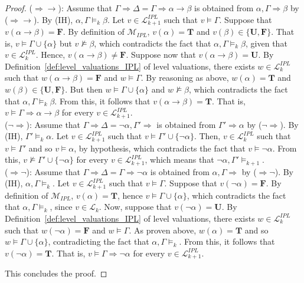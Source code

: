 \documentclass[12pt]{article}
\newcommand{\bT}{\mathbf{T}}
\newcommand{\bU}{\mathbf{U}}
\newcommand{\bF}{\mathbf{F}}
\begin{document}
\begin{proof}
%
($\Rightarrow\to$): Assume that $\Gamma \Rightarrow\Delta= \Gamma\Rightarrow \alpha \to \beta$ is obtained from $\alpha,  \Gamma \Rightarrow \beta$ by ($\Rightarrow\to$). By (IH),  $\alpha,  \Gamma\models_{k} \beta$. Let $v \in \mathcal{L}_{k+1}^{IPL}$ such that $v \models \Gamma$. Suppose that $v(\alpha \to \beta)=\bF$. By definition of $\mathcal{M}_{IPL}$, $v(\alpha)=\bT$ and $v(\beta) \in \{\bU,\bF\}$. That is, $v \models\Gamma \cup\{\alpha\}$ but $v \not\models\beta$, which contradicts the fact that $\alpha,  \Gamma\models_{k} \beta$, given that $v \in \mathcal{L}_{k}^{IPL}$. Hence, $v(\alpha \to \beta)\neq\bF$. Suppose now that $v(\alpha \to \beta)=\bU$. By Definition~\ref{def:level_valuations_IPL} of level valuations, there exists $w \in \mathcal{L}_{k}^{IPL}$ such that  $w(\alpha \to \beta)=\bF$ and $w \models \Gamma$. By reasoning as above, $w(\alpha)=\bT$ and $w(\beta) \in \{\bU,\bF\}$. But then $w \models \Gamma \cup\{\alpha\}$ and $w \not\models\beta$, which contradicts the fact that  $\alpha,  \Gamma\models_{k} \beta$. From this, it follows that  $v(\alpha \to \beta)=\bT$. That is, $v\models \Gamma\Rightarrow \alpha\to\beta$ for every $v \in \mathcal{L}_{k+1}^{IPL}$.\\[1mm]
%
($\neg\Rightarrow$): Assume that $\Gamma \Rightarrow\Delta= \neg \alpha,\Gamma'\Rightarrow$ is obtained from $\Gamma' \Rightarrow \alpha$ by ($\neg\Rightarrow$). By (IH),  $\Gamma'\models_{k} \alpha$. Let $v \in \mathcal{L}_{k+1}^{IPL}$ such that $v \models \Gamma' \cup\{\neg\alpha\}$. Then, $v \in \mathcal{L}_{k}^{IPL}$ such that $v \models \Gamma'$ and so $v \models \alpha$, by hypothesis, which contradicts the fact that $v \models \neg\alpha$.  From this,  $v \not\models\Gamma' \cup\{\neg\alpha\}$ for every $v \in \mathcal{L}_{k+1}^{IPL}$, which means that $\neg\alpha,\Gamma'\models_{k+1}$. \\[1mm]
%
($\Rightarrow\neg$): Assume that $\Gamma \Rightarrow\Delta= \Gamma\Rightarrow \neg\alpha$ is obtained from $\alpha,  \Gamma \Rightarrow$ by ($\Rightarrow\neg$). By (IH),  $\alpha,  \Gamma\models_{k} $. Let $v \in \mathcal{L}_{k+1}^{IPL}$ such that $v \models \Gamma$. Suppose that $v(\neg\alpha)=\bF$. By definition of $\mathcal{M}_{IPL}$, $v(\alpha)=\bT$, hence $v \models\Gamma \cup\{\alpha\}$, which contradicts the fact that $\alpha,  \Gamma\models_{k}$, since $v \in \mathcal{L}_{k}$. Now, suppose that $v(\neg\alpha)=\bU$. By Definition~\ref{def:level_valuations_IPL} of level valuations, there exists $w \in \mathcal{L}_{k}^{IPL}$ such that  $w(\neg\alpha)=\bF$ and $w \models \Gamma$. As proven above, $w(\alpha)=\bT$ and so $w \models \Gamma \cup\{\alpha\}$, contradicting the fact that  $\alpha,  \Gamma\models_{k}$. From this, it follows that  $v(\neg\alpha)=\bT$. That is, $v\models \Gamma\Rightarrow \neg\alpha$ for every $v \in \mathcal{L}_{k+1}^{IPL}$.

This concludes the proof.
\end{proof}
\end{document}
